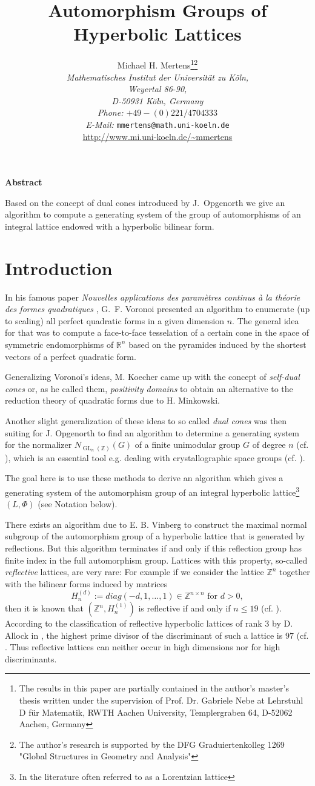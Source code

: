 \documentclass[10pt, preprint]{elsarticle}
\title{Automorphism Groups of Hyperbolic Lattices}
\author{Michael H. Mertens\footnote{The results in this paper are partially contained in the author's master's thesis \cite{Mert12} written under the supervision of Prof. Dr. Gabriele Nebe at Lehrstuhl D f\"ur Matematik, RWTH Aachen University, Templergraben 64, D-52062 Aachen, Germany}{}\footnote{The author's research is supported by the DFG Graduiertenkolleg 1269 "Global Structures in Geometry and Analysis"}\\
{\it Mathematisches Institut der Universit\"at zu K\"oln,}\\
{\it Weyertal 86-90,} \\
{\it D-50931 K\"oln, Germany}\\
{\it Phone: $+49-(0)221/4704333$}\\
{\textit{E-Mail:} \tt mmertens@math.uni-koeln.de}\\
\url{http://www.mi.uni-koeln.de/~mmertens}
}
\theoremstyle{definition}
\theoremstyle{definition}
\newcommand{\Z}{\mathbb{Z}}
\newcommand{\R}{\mathbb{R}}
\newcommand{\GL}{\operatorname{GL}}
\begin{document}
\maketitle

%

\centerline{\bf Abstract}

\noindent
Based on the concept of dual cones introduced by J.~Opgenorth we give an algorithm to compute a generating system of the group of automorphisms of an integral lattice endowed with a hyperbolic bilinear form.


\section{Introduction}
In his famous paper  \emph{Nouvelles applications des param\`{e}tres continus \`{a} la th\'{e}orie des formes quadratiques} \cite{Vor}, G.~F. Voronoi presented an algorithm to enumerate (up to scaling) all perfect quadratic forms in a given dimension $n$. The general idea for that was to compute a face-to-face tesselation of a certain cone in the space of symmetric endomorphisms of $\R^n$ based on the pyramides induced by the shortest vectors of a perfect quadratic form. 

Generalizing Voronoi's ideas, M. Koecher came up with the concept of \emph{self-dual cones} or, as he called them, \emph{positivity domains} \cite{Koe57,Koe60} to obtain an alternative to the reduction theory of quadratic forms due to H. Minkowski. 

Another slight generalization of these ideas to so called \emph{dual cones} was then suiting for J. Opgenorth to find an algorithm to determine a generating system for the normalizer $N_{\GL_n(\Z)}(G)$ of a finite unimodular group $G$ of degree $n$ (cf. \cite{Opg01}), which is an essential tool e.g. dealing with crystallographic space groups (cf. \cite{OPS}).

The goal here is to use these methods to derive an algorithm which gives a generating system of the automorphism group of an integral hyperbolic lattice\footnote{In the literature often referred to as a Lorentzian lattice} $(L,\Phi)$ (see Notation below). 

There exists an algorithm due to E. B. Vinberg \cite{Vin72} to construct the maximal normal subgroup of the automorphism group of a hyperbolic lattice that is generated by reflections. But this algorithm terminates if and only if this reflection group has finite index in the full automorphism group. Lattices with this property, so-called \emph{reflective} lattices, are very rare: For example if we consider the lattice $\Z^n$ together with the bilinear forms induced by matrices 
\[H^{(d)}_n:=diag(-d,1,\dots ,1)\in\Z^{n\times n}\text{ for }d>0,\]
then it is known that $(\Z^n,H^{(1)}_n)$ is reflective if and only if $n\leq 19$ (cf. \cite{Vin72}). According to the classification of reflective hyperbolic lattices of rank $3$ by D. Allock in \cite{Lorentz}, the highest prime divisor of the discriminant of such a lattice is $97$ (cf. \cite[p. 24]{Lorentz}. Thus reflective lattices can neither occur in high dimensions nor for high discriminants.
\end{document}
